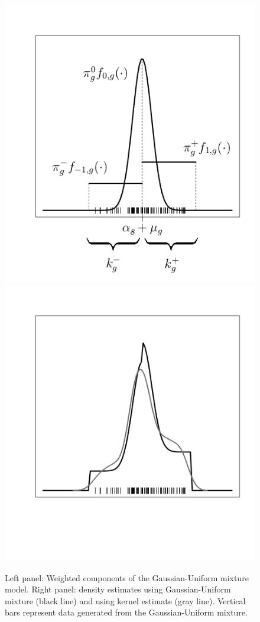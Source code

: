 \begin{figure}[!ht]
  \centering
  \includegraphics[scale = 0.5]{./veera/ex_poe_a_mod.png}
  \includegraphics[scale = 0.5]{./veera/ex_poe_b.png}
\caption{Left panel: Weighted components of the Gaussian-Uniform mixture model. Right panel: density estimates using Gaussian-Uniform mixture (black line) and using kernel estimate (gray line). Vertical bars represent data generated from the Gaussian-Uniform mixture.}
\label{fig:poe_ex}
\end{figure}


